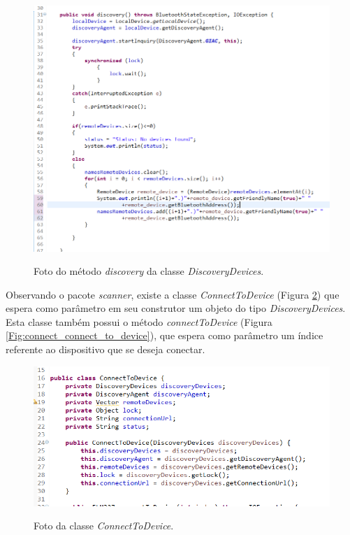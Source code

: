 \begin{figure}[!ht]
\centering
\caption{Foto do método \textit{discovery} da classe \textit{DiscoveryDevices}.} 
{\includegraphics[scale=.70]{imagens/pacoteBluetooth-DiscoveryDevices_discovery.png}}\\
 \label{Fig:discovery}
\end{figure}

Observando o pacote \textit{scanner}, existe a classe \textit{ConnectToDevice} (Figura \ref{Fig:connect_to_device}) que espera como parâmetro em seu construtor um objeto do tipo \textit{DiscoveryDevices}. Esta classe também possui o método \textit{connectToDevice} (Figura \ref{Fig:connect_connect_to_device}), que espera como parâmetro um índice referente ao dispositivo que se deseja conectar. 

\begin{figure}[!ht]
\centering
\caption{Foto da classe \textit{ConnectToDevice}.} 
{\includegraphics[scale=.80]{imagens/pacoteScanner-ConnectToDevice.png}}\\
 \label{Fig:connect_to_device}
\end{figure}

